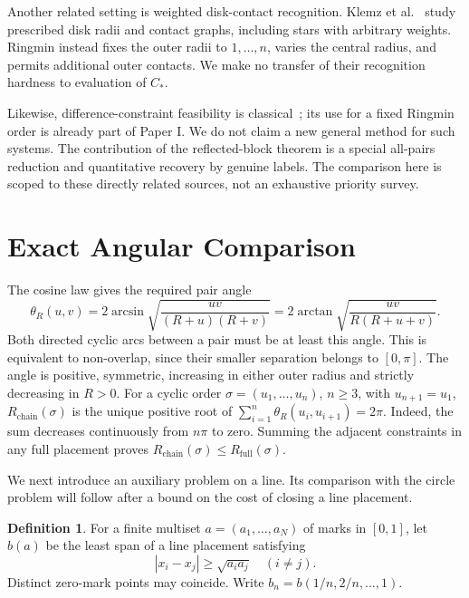 \documentclass[11pt,letterpaper]{article}
\theoremstyle{definition}\newtheorem{definition}[theorem]{Definition}
\theoremstyle{remark}\newtheorem{remark}[theorem]{Remark}
\newcommand{\ch}{R_{\mathrm{chain}}}
\newcommand{\full}{R_{\mathrm{full}}}
\newcommand{\CC}{C_\ast}
\DeclareMathOperator{\atan}{arctan}
\DeclareMathOperator{\asin}{arcsin}
\begin{document}
Another related setting is weighted disk-contact recognition.
Klemz et al.~\cite{contact} study prescribed disk radii
and contact graphs, including stars with arbitrary weights. Ringmin instead
fixes the outer radii to $1,\ldots,n$, varies the central radius, and permits
additional outer contacts. We make no transfer of their recognition
hardness to evaluation of $\CC$.

Likewise, difference-constraint feasibility is classical~\cite{temporal};
its use for a fixed Ringmin order is already part of Paper I. We do not
claim a new general method for such systems. The contribution of the
reflected-block theorem is a special all-pairs reduction and quantitative
recovery by genuine labels. The comparison here is scoped to these directly
related sources, not an exhaustive priority survey.

\section{Exact Angular Comparison}\label{sec:line}

The cosine law gives the required pair angle
\begin{equation}\label{eq:theta}
 \theta_R(u,v)=2\asin\sqrt{\frac{uv}{(R+u)(R+v)}}
 =2\atan\sqrt{\frac{uv}{R(R+u+v)}}.
\end{equation}
Both directed cyclic arcs between a pair must be at least this angle.
This is equivalent to non-overlap, since their smaller separation belongs
to $[0,\pi]$. The angle is positive, symmetric, increasing in either
outer radius and strictly decreasing in $R>0$.
For a cyclic order $\sigma=(u_1,\ldots,u_n)$, $n\ge3$, with $u_{n+1}=u_1$,
$\ch(\sigma)$ is the unique positive root of
$\sum_{i=1}^n\theta_R(u_i,u_{i+1})=2\pi$.
Indeed, the sum decreases continuously from $n\pi$ to zero. Summing the
adjacent constraints in any full placement proves $\ch(\sigma)\le\full(\sigma)$.

We next introduce an auxiliary problem on a line. Its comparison with the
circle problem will follow after a bound on the cost of closing a line
placement.

\begin{definition}
For a finite multiset $a=(a_1,\ldots,a_N)$ of marks in $[0,1]$, let $b(a)$
be the least span of a line placement satisfying
\begin{equation}\label{eq:line}
 |x_i-x_j|\ge\sqrt{a_i a_j}\quad(i\ne j).
\end{equation}
Distinct zero-mark points may coincide. Write $b_n=b(1/n,2/n,\ldots,1)$.
\end{definition}
\end{document}
